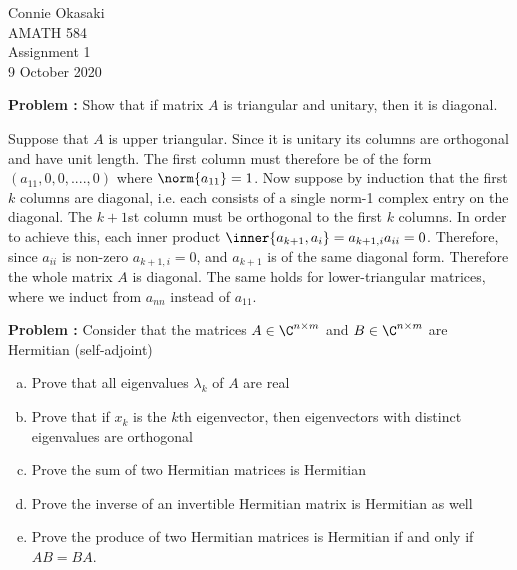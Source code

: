 \documentclass[letter, 12pt]{article}
\begin{document}
\parindent=0in
\newenvironment{problem}[1][]
   {\begin{framed} \textbf{Problem \theprobnum: #1}}
   {\end{framed}\stepcounter{probnum}}
\newenvironment{bookproblem}[1]
   {\begin{framed} \textbf{Problem #1:}}
   {\end{framed}\stepcounter{probnum}}

\begin{flushright}
Connie Okasaki \\
AMATH 584\\
Assignment 1\\
9 October 2020
\end{flushright}

\begin{problem}
Show that if matrix $A$ is triangular and unitary, then it is diagonal.
\end{problem}

Suppose that $A$ is upper triangular. Since it is unitary its columns are orthogonal and have unit length. The first column must therefore be of the form $(a_{11},0,0,....,0)$ where $\norm{a_{11}}=1$. Now suppose by induction that the first $k$ columns are diagonal, i.e. each consists of a single norm-1 complex entry on the diagonal. The $k+1$st column must be orthogonal to the first $k$ columns. In order to achieve this, each inner product $\inner{a_{k+1},a_i} = a_{k+1,i}a_{ii} = 0$. Therefore, since $a_{ii}$ is non-zero $a_{k+1,i}=0$, and $a_{k+1}$ is of the same diagonal form. Therefore the whole matrix $A$ is diagonal. The same holds for lower-triangular matrices, where we induct from $a_{nn}$ instead of $a_{11}$. 

\pagebreak


\begin{problem}
Consider that the matrices $A\in \C^{n\times m}$ and $B\in\C^{n\times m}$ are Hermitian (self-adjoint)
\begin{enumerate}[(a)]
\item Prove that all eigenvalues $\lambda_k$ of $A$ are real
\item Prove that if $x_k$ is the $k$th eigenvector, then eigenvectors with distinct eigenvalues are orthogonal
\item Prove the sum of two Hermitian matrices is Hermitian
\item Prove the inverse of an invertible Hermitian matrix is Hermitian as well
\item Prove the produce of two Hermitian matrices is Hermitian if and only if $AB=BA$.
\end{enumerate}		
\end{problem}
\end{document}
